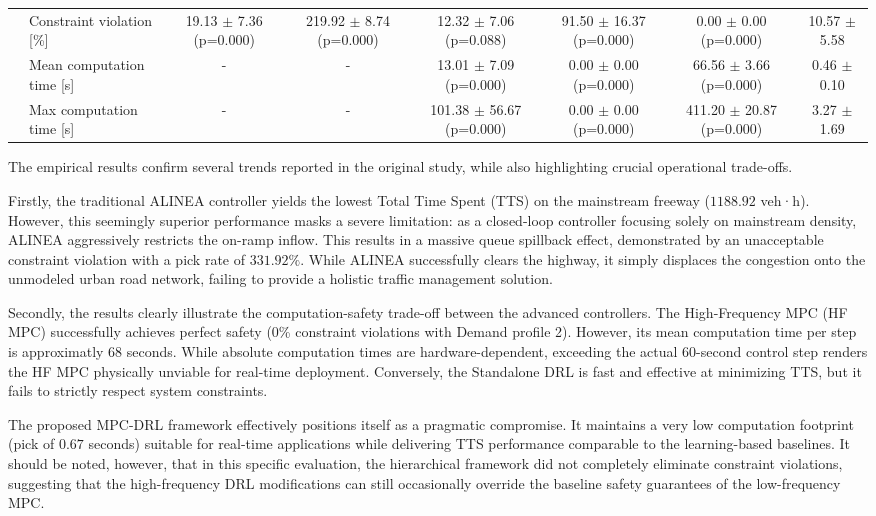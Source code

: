 \begin{table}[htbp]
{\begin{tabular}{llcccccc}
 & Constraint violation [\%] & 19.13 $\pm$ 7.36 (p=0.000) & 219.92 $\pm$ 8.74 (p=0.000) & 12.32 $\pm$ 7.06 (p=0.088) & 91.50 $\pm$ 16.37 (p=0.000) & 0.00 $\pm$ 0.00 (p=0.000) & 10.57 $\pm$ 5.58 \\
 & Mean computation time [s] & - & - & 13.01 $\pm$ 7.09 (p=0.000) & 0.00 $\pm$ 0.00 (p=0.000) & 66.56 $\pm$ 3.66 (p=0.000) & 0.46 $\pm$ 0.10 \\
 & Max computation time [s] & - & - & 101.38 $\pm$ 56.67 (p=0.000) & 0.00 $\pm$ 0.00 (p=0.000) & 411.20 $\pm$ 20.87 (p=0.000) & 3.27 $\pm$ 1.69 \\
\bottomrule
\end{tabular}%
}
\end{table}

The empirical results confirm several trends reported in the original study, while also highlighting crucial operational trade-offs. 

Firstly, the traditional ALINEA controller yields the lowest Total Time Spent (TTS) on the mainstream freeway ($1188.92$ veh·h). However, this seemingly superior performance masks a severe limitation: as a closed-loop controller focusing solely on mainstream density, ALINEA aggressively restricts the on-ramp inflow. This results in a massive queue spillback effect, demonstrated by an unacceptable constraint violation with a pick rate of $331.92\%$. While ALINEA successfully clears the highway, it simply displaces the congestion onto the unmodeled urban road network, failing to provide a holistic traffic management solution.

Secondly, the results clearly illustrate the computation-safety trade-off between the advanced controllers. The High-Frequency MPC (HF MPC) successfully achieves perfect safety (0\% constraint violations with Demand profile 2). However, its mean computation time per step is approximatly $68$ seconds. While absolute computation times are hardware-dependent, exceeding the actual $60$-second control step renders the HF MPC physically unviable for real-time deployment. Conversely, the Standalone DRL is fast and effective at minimizing TTS, but it fails to strictly respect system constraints. 

The proposed MPC-DRL framework effectively positions itself as a pragmatic compromise. It maintains a very low computation footprint (pick of $0.67$ seconds) suitable for real-time applications while delivering TTS performance comparable to the learning-based baselines. It should be noted, however, that in this specific evaluation, the hierarchical framework did not completely eliminate constraint violations, suggesting that the high-frequency DRL modifications can still occasionally override the baseline safety guarantees of the low-frequency MPC.

